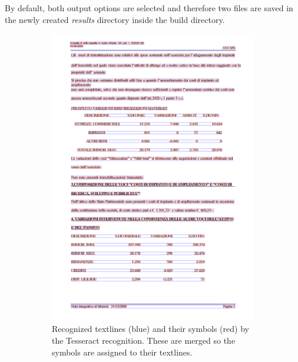 By default, both output options are selected and therefore two files are saved in the newly created \emph{results} directory inside the build directory.

\begin{figure}[p]
\begin{subfigure}{0.45\textwidth}
\includegraphics[width=\linewidth]{img/implementation/implem1.png}
\caption{Recognized textlines (blue) and their symbols (red) by the Tesseract recognition. These are merged so the symbols are assigned to their textlines.}
\label{fig:implem1}
\end{subfigure}
\qquad
\begin{subfigure}{0.45\textwidth}

\end{subfigure}
\end{figure}
